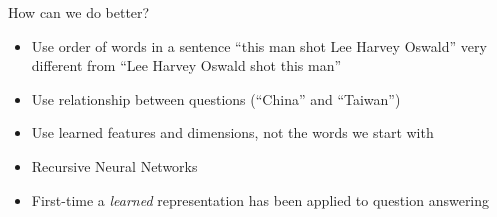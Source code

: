 \documentclass[compress]{beamer}
\begin{document}
\begin{frame}[t]
\begin{columns}
\begin{center}
		\end{center}
\end{columns}

\end{frame}

\begin{frame}{How can we do better?}

  \begin{itemize}
    \item Use order of words in a sentence ``this man shot Lee Harvey Oswald'' very different from ``Lee Harvey Oswald shot this man''
    \item Use relationship between questions (``China'' and
      ``Taiwan'')
    \item Use learned features and dimensions, not the words we start with
      \pause
    \item Recursive Neural Networks~\cite{socher-12}
    \item First-time a \emph{learned} representation has been applied
      to question answering
  \end{itemize}

\end{frame}
\end{document}
